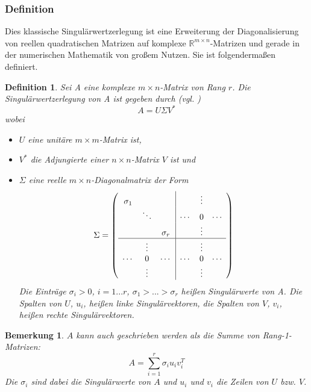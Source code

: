 \documentclass[12pt,a4paper,twoside]{article}
\newtheorem{Definition}[Satz]{Definition}
\newtheorem{Bemerkung}{Bemerkung}
\begin{document}
		\subsubsection{Definition}
		Dies klassische Singulärwertzerlegung ist eine Erweiterung der Diagonalisierung von reellen quadratischen 
		Matrizen auf komplexe $\mathds{R}^{m\times n}$-Matrizen und gerade in der numerischen Mathematik von großem 
		Nutzen. Sie ist folgendermaßen definiert.		
		\begin{Definition}
		Sei A eine komplexe $m\times n$-Matrix von Rang $r$. Die Singulärwertzerlegung von A ist gegeben durch (vgl. 			\cite{deuflhard2008})
		\begin{equation*}
			\label{eq:SVD}
			A=U\Sigma V^* 
		\end{equation*}
		wobei
		\begin{itemize}
			\item $U$ eine unitäre $m\times m$-Matrix ist,
			\item $V^*$ die Adjungierte einer $n\times n$-Matrix $V$ ist und
			\item $\Sigma$ eine reelle $m\times n$-Diagonalmatrix der Form \[
	 		\Sigma = \left(\begin{array}{ccc|ccc}
					\sigma_1 &          &         &       & \vdots &       \\
         			& \ddots   &         & \cdots & 0      & \cdots \\
         			&      &\sigma_r &        & \vdots &        \\
					\hline
        			 &  \vdots  &        &       & \vdots &        \\
					\cdots   & 0       & \cdots   & \cdots & 0      & \cdots \\
        			 &  \vdots  &         &        & \vdots &        \\
					\end{array}\right)
			\]
			Die Einträge $\sigma_i>0$, $i=1...r$, $\sigma_1>...>\sigma_r$ heißen Singulärwerte von A. Die Spalten von $U$, $u_i$, heißen linke Singulärvektoren, die Spalten von $V$, $v_i$, heißen rechte Singulärvektoren.
		\end{itemize}
		\end{Definition}
		\begin{Bemerkung}
			$A$ kann auch geschrieben werden als die Summe von Rang-1-Matrizen:
			\begin{equation*}
				\label{eq:SVDsum}
				A=\sum_{i=1}^r\sigma_i u_i v_i^T
			\end{equation*}
			Die $\sigma_i$ sind dabei die Singulärwerte von $A$ und $u_i$ und $v_i$ die Zeilen von $U$ bzw. $V$.
		\end{Bemerkung}
\end{document}

